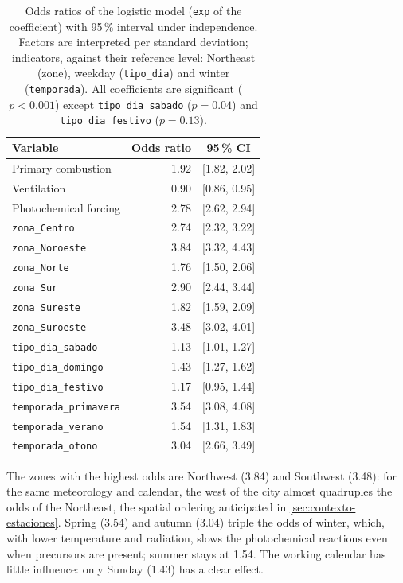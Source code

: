 \begin{table}[pos=t]
  \centering
  \caption{Odds ratios of the logistic model (\texttt{exp} of the
    coefficient) with 95\,\% interval under independence. Factors are
    interpreted per standard deviation; indicators, against their reference
    level: Northeast (zone), weekday (\texttt{tipo\_dia}) and winter
    (\texttt{temporada}). All coefficients are significant ($p<0.001$)
    except \texttt{tipo\_dia\_sabado} ($p=0.04$) and
    \texttt{tipo\_dia\_festivo} ($p=0.13$).}
  \label{tab:momios-log}
  \small
  \begin{tabular}{lrc}
    \toprule
    Variable & Odds ratio & 95\,\% CI \\
    \midrule
    Primary combustion      & 1.92 & [1.82, 2.02] \\
    Ventilation             & 0.90 & [0.86, 0.95] \\
    Photochemical forcing   & 2.78 & [2.62, 2.94] \\
    \midrule
    \texttt{zona\_Centro}    & 2.74 & [2.32, 3.22] \\
    \texttt{zona\_Noroeste}  & 3.84 & [3.32, 4.43] \\
    \texttt{zona\_Norte}     & 1.76 & [1.50, 2.06] \\
    \texttt{zona\_Sur}       & 2.90 & [2.44, 3.44] \\
    \texttt{zona\_Sureste}   & 1.82 & [1.59, 2.09] \\
    \texttt{zona\_Suroeste}  & 3.48 & [3.02, 4.01] \\
    \midrule
    \texttt{tipo\_dia\_sabado}  & 1.13 & [1.01, 1.27] \\
    \texttt{tipo\_dia\_domingo} & 1.43 & [1.27, 1.62] \\
    \texttt{tipo\_dia\_festivo} & 1.17 & [0.95, 1.44] \\
    \midrule
    \texttt{temporada\_primavera} & 3.54 & [3.08, 4.08] \\
    \texttt{temporada\_verano}    & 1.54 & [1.31, 1.83] \\
    \texttt{temporada\_otono}     & 3.04 & [2.66, 3.49] \\
    \bottomrule
  \end{tabular}
\end{table}

The zones with the highest odds are Northwest (3.84) and Southwest (3.48):
for the same meteorology and calendar, the west of the city almost
quadruples the odds of the Northeast, the spatial ordering anticipated in
\cref{sec:contexto-estaciones}. Spring (3.54) and autumn (3.04) triple the
odds of winter, which, with lower temperature and radiation, slows the
photochemical reactions even when precursors are present; summer stays at
1.54. The working calendar has little influence: only Sunday (1.43) has a
clear effect.

